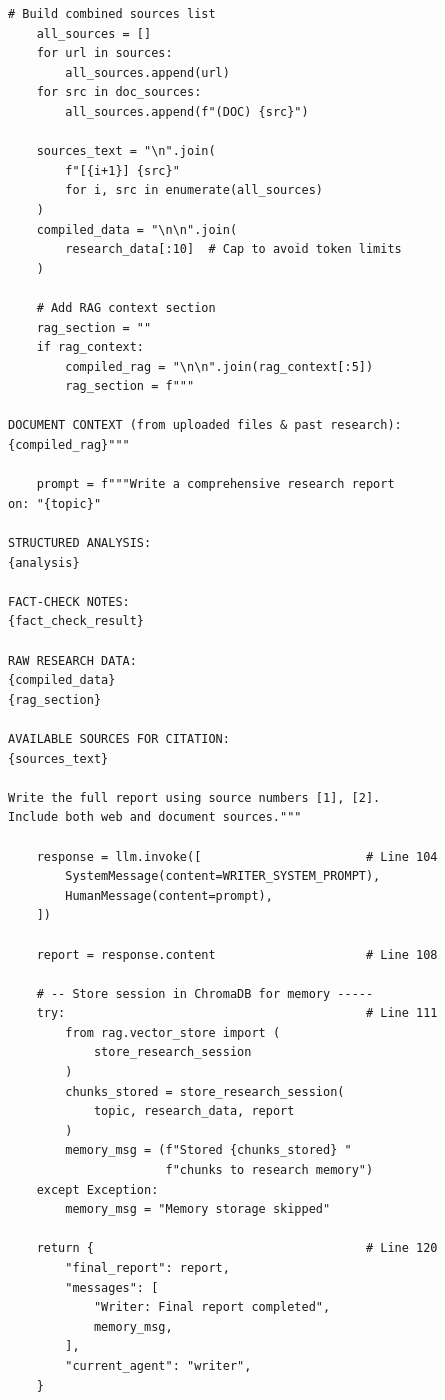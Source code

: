 \documentclass[12pt, a4paper]{article}
\begin{document}
\begin{lstlisting}[style=pythonstyle, title={\color{accentgreen}\faIcon{file} agents/writer.py --- Full Code (135 lines)}]
    # Build combined sources list
    all_sources = []
    for url in sources:
        all_sources.append(url)
    for src in doc_sources:
        all_sources.append(f"(DOC) {src}")

    sources_text = "\n".join(
        f"[{i+1}] {src}"
        for i, src in enumerate(all_sources)
    )
    compiled_data = "\n\n".join(
        research_data[:10]  # Cap to avoid token limits
    )

    # Add RAG context section
    rag_section = ""
    if rag_context:
        compiled_rag = "\n\n".join(rag_context[:5])
        rag_section = f"""

DOCUMENT CONTEXT (from uploaded files & past research):
{compiled_rag}"""

    prompt = f"""Write a comprehensive research report
on: "{topic}"

STRUCTURED ANALYSIS:
{analysis}

FACT-CHECK NOTES:
{fact_check_result}

RAW RESEARCH DATA:
{compiled_data}
{rag_section}

AVAILABLE SOURCES FOR CITATION:
{sources_text}

Write the full report using source numbers [1], [2].
Include both web and document sources."""

    response = llm.invoke([                       # Line 104
        SystemMessage(content=WRITER_SYSTEM_PROMPT),
        HumanMessage(content=prompt),
    ])

    report = response.content                     # Line 108

    # -- Store session in ChromaDB for memory -----
    try:                                          # Line 111
        from rag.vector_store import (
            store_research_session
        )
        chunks_stored = store_research_session(
            topic, research_data, report
        )
        memory_msg = (f"Stored {chunks_stored} "
                      f"chunks to research memory")
    except Exception:
        memory_msg = "Memory storage skipped"

    return {                                      # Line 120
        "final_report": report,
        "messages": [
            "Writer: Final report completed",
            memory_msg,
        ],
        "current_agent": "writer",
    }
\end{lstlisting}
\end{document}
